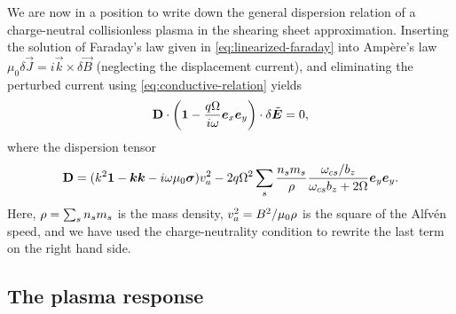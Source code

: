 \documentclass[aps,pre,notitlepage,amsmath,amssymb,amsfonts,nobibnotes,nofootinbib,superscriptaddress]{revtex4-1}
\begin{document}
We are now in a position to write down the general dispersion relation of a
charge-neutral collisionless plasma in the shearing sheet approximation.
Inserting the solution of Faraday's law given in \cref{eq:linearized-faraday}
into Ampère's law $\mu_0\delta\vec{J}=i\vec{k}\times\delta\vec{B}$ (neglecting
the displacement current), and eliminating the perturbed current using
\cref{eq:conductive-relation} yields
\begin{equation}
  \label{eq:dispersion-relation}
  \mathbf{D}\cdot\left(
    \mathbf{1} - \frac{q\Omega}{i\omega}\ex\ey
  \right)\cdot\delta\tvec{E} = 0,
\end{equation}
where the dispersion tensor
\begin{equation}
  \label{eq:dispersion-tensor}
  \mathbf{D} =
  (k^2\mathbf{1} - \vec{k}\vec{k} - i\omega\mu_0\vec{\sigma})\va^2
  - 2q\Omega^2\sums\frac{n_s m_s}{\rho}
  \frac{\omcs/b_z}{\omcs b_z + 2\Omega}\ey\ey.
\end{equation}
Here, $\rho=\sum_s{}n_s{}m_s$ is the mass density, $v_a^2=B^2/\mu_0\rho$ is
the square of the Alfvén speed, and we have used the charge-neutrality
condition to rewrite the last term on the right hand side.

\subsection{The plasma response}
\label{sec:plasma-response}
\end{document}
